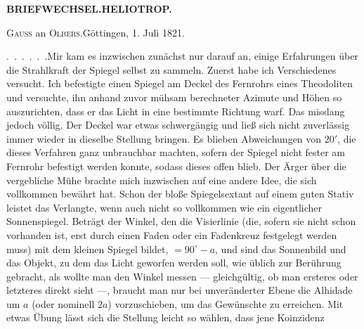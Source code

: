 \par\clearpage
\noindent\null\hfill{\small\textbf{BRIEFWECHSEL.\quad HELIOTROP.}}\hfill{}\par
\vspace*{4.2cm}
\begin{center}{\fontsize{19}{24}\selectfont{}}\end{center}
\vspace*{1.5cm}
\begin{center}{\large\textsc{Gauss} an \textsc{Olbers}.\quad Göttingen, 1. Juli 1821.}\end{center}
\par\noindent\hspace*{\parindent}.\ .\ .\ .\ .\ .\enspace Mir kam es inzwischen zunächst nur darauf an, einige Erfahrungen über die Strahlkraft der Spiegel selbst zu sammeln. Zuerst habe ich Verschiedenes versucht. Ich befestigte einen Spiegel am Deckel des Fernrohrs eines Theodoliten und versuchte, ihn anhand zuvor mühsam berechneter Azimute und Höhen so auszurichten, dass er das Licht in eine bestimmte Richtung warf. Das misslang jedoch völlig. Der Deckel war etwas schwergängig und ließ sich nicht zuverlässig immer wieder in dieselbe Stellung bringen. Es blieben Abweichungen von $20'$, die dieses Verfahren ganz unbrauchbar machten, sofern der Spiegel nicht fester am Fernrohr befestigt werden konnte, sodass dieses offen blieb. Der Ärger über die vergebliche Mühe brachte mich inzwischen auf eine andere Idee, die sich vollkommen bewährt hat. Schon der bloße Spiegelsextant auf einem guten Stativ leistet das Verlangte, wenn auch nicht so vollkommen wie ein eigentlicher Sonnenspiegel. Beträgt der Winkel, den die Visierlinie (die, sofern sie nicht schon vorhanden ist, erst durch einen Faden oder ein Fadenkreuz festgelegt werden muss) mit dem kleinen Spiegel bildet, $=90^\circ-a$, und sind das Sonnenbild und das Objekt, zu dem das Licht geworfen werden soll, wie üblich zur Berührung gebracht, als wollte man den Winkel messen --- gleichgültig, ob man ersteres oder letzteres direkt sieht ---, braucht man nur bei unveränderter Ebene die Alhidade um $a$ (oder nominell $2a$) vorzuschieben, um das Gewünschte zu erreichen. Mit etwas Übung lässt sich die Stellung leicht so wählen, dass jene Koinzidenz
\par\medskip\noindent\makebox[.86\linewidth][r]{59\textsuperscript{*}}\par

